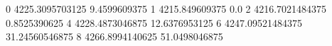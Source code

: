 0 4225.3095703125 9.4599609375
1 4215.849609375 0.0
2 4216.7021484375 0.8525390625
4 4228.4873046875 12.6376953125
6 4247.09521484375 31.24560546875
8 4266.8994140625 51.0498046875
